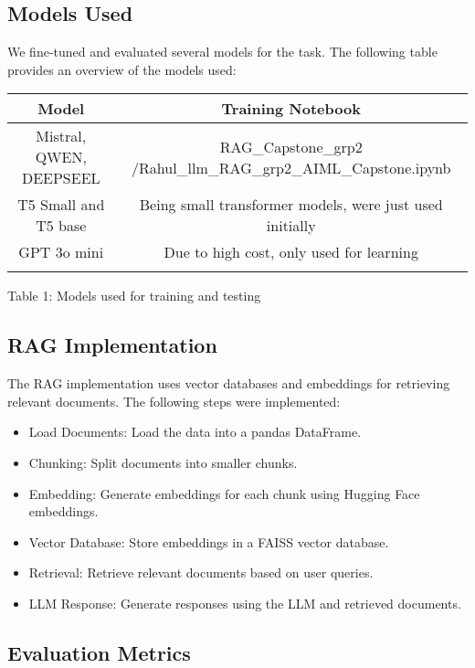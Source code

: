 \documentclass{article}
\begin{document}
\subsection{Models Used}

We fine-tuned and evaluated several models for the task. The following table provides an overview of the models used:
\begin{center}
\begin{tabular}{|c|c|}
\hline
Model & Training Notebook \\
\hline
Mistral, QWEN, DEEPSEEL& RAG_Capstone_grp2
/Rahul_llm_RAG_grp2_AIML_Capstone.ipynb\\
T5 Small and T5 base& Being small transformer models, were just used initially\\
GPT 3o mini& Due to high cost, only used for learning\\
& \\
\hline
\end{tabular}
\end{center}

Table 1: Models used for training and testing


\subsection{RAG Implementation}

The RAG implementation uses vector databases and embeddings for retrieving relevant documents. The following steps were implemented:
\begin{itemize}
    \item Load Documents: Load the data into a pandas DataFrame.
    \item Chunking: Split documents into smaller chunks.
    \item Embedding: Generate embeddings for each chunk using Hugging Face embeddings.
    \item Vector Database: Store embeddings in a FAISS vector database.
    \item Retrieval: Retrieve relevant documents based on user queries.
    \item LLM Response: Generate responses using the LLM and retrieved documents.
\end{itemize}

\subsection{Evaluation Metrics}
\end{document}
